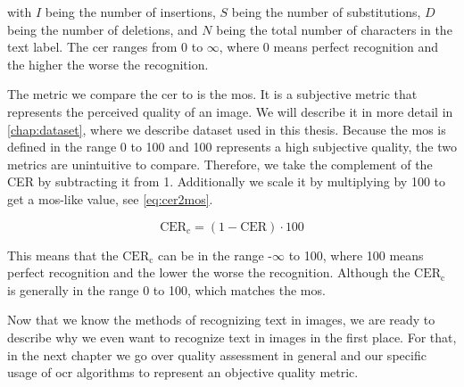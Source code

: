 with $I$ being the number of insertions, $S$ being the number of substitutions, $D$ being the number of deletions, and $N$ being the total number of characters in the text label.
The \gls{cer} ranges from 0 to $\infty$, where 0 means perfect recognition and the higher the worse the recognition.

The metric we compare the \gls{cer} to is the \gls{mos}.
It is a subjective metric that represents the perceived quality of an image.
We will describe it in more detail in \autoref{chap:dataset}, where we describe dataset used in this thesis.
Because the \gls{mos} is defined in the range 0 to 100 and 100 represents a high subjective quality, the two metrics are unintuitive to compare.
Therefore, we take the complement of the CER by subtracting it from 1.
Additionally we scale it by multiplying by 100 to get a \gls{mos}-like value, see \autoref{eq:cer2mos}.

\begin{equation}
    \text{CER}_{c} = (1 - \text{CER}) \cdot 100
    \label{eq:cer2mos}
\end{equation}

This means that the $\text{CER}_{\text{c}}$ can be in the range -$\infty$ to 100, where 100 means perfect recognition and the lower the worse the recognition.
Although the $\text{CER}_{\text{c}}$ is generally in the range 0 to 100, which matches the \gls{mos}.

Now that we know the methods of recognizing text in images, we are ready to describe why we even want to recognize text in images in the first place.
For that, in the next chapter we go over quality assessment in general and our specific usage of \gls{ocr} algorithms to represent an objective quality metric.









